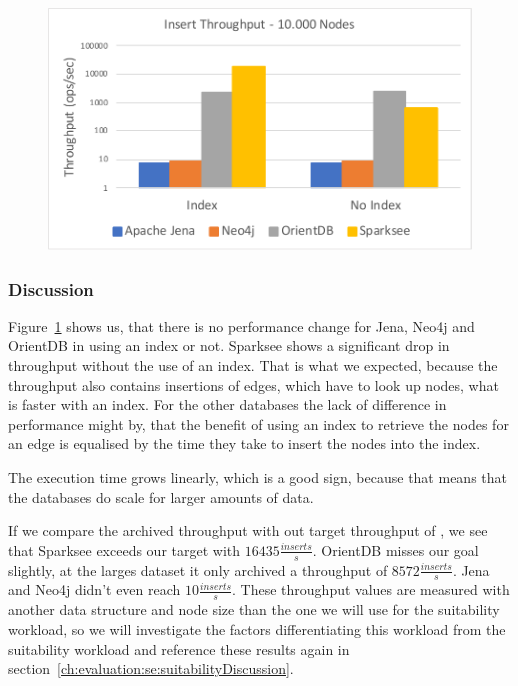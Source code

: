 \begin{figure}[h!]
  \centering
  \includegraphics[width=.75\textwidth]{images/throughput/withWithoutIndexThroughputFixNodes}
  \label{fig:withWithoutIndexThroughputFixNodes}
\end{figure}

\subsubsection{Discussion}
Figure~\ref{fig:withWithoutIndexThroughputFixNodes} shows us,
that there is no performance change for Jena, Neo4j and OrientDB in using an index or not.
Sparksee shows a significant drop in throughput without the use of an index.
That is what we expected,
because the throughput also contains insertions of edges,
which have to look up nodes,
what is faster with an index.
For the other databases the lack of difference in performance might by,
that the benefit of using an index to retrieve the nodes for an edge is equalised by the time they take to insert the nodes into the index.

The execution time grows linearly,
which is a good sign,
because that means that the databases do scale for larger amounts of data.

If we compare the archived throughput with out target throughput of ,
we see that Sparksee exceeds our target with $ 16435 \frac{inserts}{s} $.
OrientDB misses our goal slightly,
at the larges dataset it only archived a throughput of $ 8572 \frac{inserts}{s} $.
Jena and Neo4j didn't even reach $ 10 \frac{inserts}{s} $.
These throughput values are measured with another data structure and node size than the one we will use for the suitability workload,
so we will investigate the factors differentiating this workload from the suitability workload and reference these results again in section~\ref{ch:evaluation:se:suitabilityDiscussion}.

